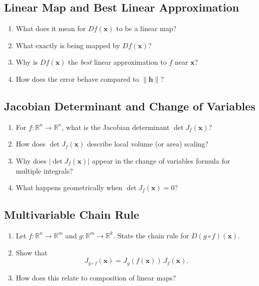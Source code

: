 \subsection{Linear Map and Best Linear Approximation}

\begin{enumerate}[resume]
  \item What does it mean for \(Df(\mathbf{x})\) to be a linear map?
  \item What exactly is being mapped by \(Df(\mathbf{x})\)?
  \item Why is \(Df(\mathbf{x})\) the \emph{best} linear approximation to \(f\) near \(\mathbf{x}\)?
  \item How does the error behave compared to \(\|\mathbf{h}\|\)?
\end{enumerate}

\subsection{Jacobian Determinant and Change of Variables}

\begin{enumerate}[resume]
  \item For \(f : \mathbb{R}^{n} \to \mathbb{R}^{n}\), what is the Jacobian determinant \(\det J_{f}(\mathbf{x})\)?
  \item How does \(\det J_{f}(\mathbf{x})\) describe local volume (or area) scaling?
  \item Why does \(|\det J_{f}(\mathbf{x})|\) appear in the change of variables formula for multiple integrals?
  \item What happens geometrically when \(\det J_{f}(\mathbf{x}) = 0\)?
\end{enumerate}

\subsection{Multivariable Chain Rule}

\begin{enumerate}[resume]
  \item Let \(f : \mathbb{R}^{n} \to \mathbb{R}^{m}\) and \(g : \mathbb{R}^{m} \to \mathbb{R}^{k}\). State the chain rule for \(D(g \circ f)(\mathbf{x})\).
  \item Show that
    \[ J_{g \circ f}(\mathbf{x}) = J_{g}(f(\mathbf{x})) \, J_{f}(\mathbf{x}). \]
  \item How does this relate to composition of linear maps?
\end{enumerate}

